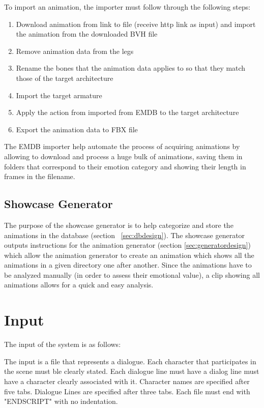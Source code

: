 \medskip
\noindent To import an animation, the importer must follow through the following steps:
\begin{enumerate}
\item Download animation from link to file (receive http link as input) and import the animation from the downloaded BVH file
\item Remove animation data from the legs
\item Rename the bones that the animation data applies to so that they match those of the target architecture
\item Import the target armature
\item Apply the action from imported from EMDB to the target architecture
\item Export the animation data to FBX file
\end{enumerate}

The EMDB importer help automate the process of acquiring animations by allowing to download and process a huge bulk of animations, saving them in folders that correspond to their emotion category and showing their length in frames in the filename.

\subsection{Showcase Generator \label{sec:showcasegenerator}}
The purpose of the showcase generator is to help categorize and store the animations in the database (section ~\ref{sec:dbdesign}). The showcase generator outputs instructions for the animation generator (section \ref{sec:generatordesign}) which allow the animation generator to create an animation which shows all the animations in a given directory one after another. Since the animations have to be analyzed manually (in order to assess their emotional value), a clip showing all animations allows for a quick and easy analysis.


\section{Input}

The input of the system is as follows:

The input is a file that represents a dialogue. Each character that participates in the scene must ble clearly stated. Each dialogue line must have a dialog line must have a character clearly associated with it. Character names are specified after five tabs. Dialogue Lines are specified after three tabs. Each file must end with "ENDSCRIPT" with no indentation.

